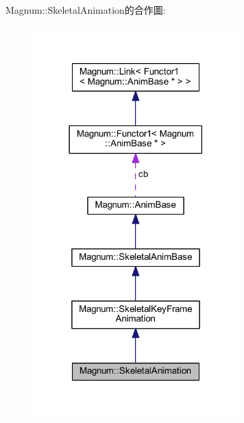 Magnum\+:\+:Skeletal\+Animation的合作圖\+:\nopagebreak
\begin{figure}[H]
\begin{center}
\leavevmode
\includegraphics[width=225pt]{class_magnum_1_1_skeletal_animation__coll__graph}
\end{center}
\end{figure}
